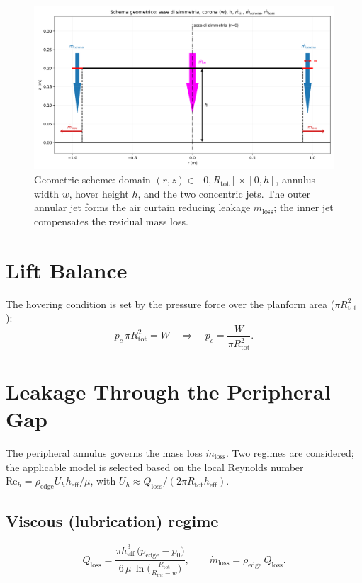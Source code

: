 \documentclass[11pt,a4paper]{article}
\begin{document}
\begin{figure}[t]
  \centering
  \includegraphics[width=0.95\linewidth]{./figures/schema_geometry.png}
  \caption{Geometric scheme: domain $(r,z)\in[0,R_{\text{tot}}]\times[0,h]$, annulus width $w$, hover height $h$, and the two concentric jets. The outer annular jet forms the air curtain reducing leakage $\dot m_{\mathrm{loss}}$; the inner jet compensates the residual mass loss.}
  \label{fig:geometry}
\end{figure}

\section{Lift Balance}
The hovering condition is set by the pressure force over the planform area ($\pi R_{\text{tot}}^2$):
\begin{equation}
  p_c\,\pi R_{\text{tot}}^2 = W
  \quad \Rightarrow \quad
  p_c = \frac{W}{\pi R_{\text{tot}}^2}.
  \label{eq:lift}
\end{equation}

\section{Leakage Through the Peripheral Gap}
The peripheral annulus governs the mass loss $\dot m_{\mathrm{loss}}$.
Two regimes are considered; the applicable model is selected based on the local Reynolds number
$\mathrm{Re}_h=\rho_\mathrm{edge} U_h h_{\mathrm{eff}}/\mu$, with $U_h\approx Q_{\mathrm{loss}}/(2\pi R_{\text{tot}} h_{\mathrm{eff}})$.

\subsection*{Viscous (lubrication) regime}
\begin{equation}
  Q_{\mathrm{loss}}
  = \frac{\pi h_{\mathrm{eff}}^{3}\,\big(p_\mathrm{edge}-p_0\big)}{6\,\mu\,\ln\!\big(\tfrac{R_{\text{tot}}}{R_{\text{tot}}-w}\big)},
  \qquad \dot m_{\mathrm{loss}}=\rho_\mathrm{edge}\,Q_{\mathrm{loss}}.
  \label{eq:qloss_lub}
\end{equation}
\end{document}
